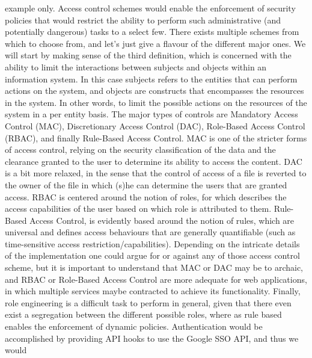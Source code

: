 \documentclass[11pt]{amsart}
\begin{document}
\begin{enumarate}
          example only. Access control schemes would enable the enforcement of security
          policies that would restrict the ability to perform such administrative (and
          potentially dangerous) tasks to a select few. There exists multiple schemes from
          which to choose from, and let's just give a flavour of the different major ones.
          We will start by making sense of the third definition, which is concerned with
          the ability to limit the interactions between subjects and objects within an
          information system. In this case subjects refers to the entities that can
          perform actions on the system, and objects are constructs that encompasses the
          resources in the system. In other words, to limit the possible actions on the
          resources of the system in a per entity basis. The major types of controls are
          Mandatory Access Control (MAC), Discretionary Access Control (DAC), Role-Based
          Access Control (RBAC), and finally Rule-Based Access Control. MAC is one of the
          stricter forms of access control, relying on the security classification of the
          data and the clearance granted to the user to determine its ability to access
          the content. DAC is a bit more relaxed, in the sense that the control of access
          of a file is reverted to the owner of the file in which (s)he can determine the
          users that are granted access. RBAC is centered around the notion of roles, for
          which describes the access capabilities of the user based on which role is
          attributed to them. Rule-Based Access Control, is evidently based around the
          notion of rules, which are universal and defines access behaviours that are
          generally quantifiable (such as time-sensitive access
          restriction/capabilities). Depending on the intricate details of the
          implementation one could argue for or against any of those access control
          scheme, but it is important to understand that MAC or DAC may be to archaic, and
          RBAC or Role-Based Access Control are more adequate for web applications, in
          which multiple services maybe contracted to achieve its functionality. Finally,
          role engineering is a difficult task to perform in general, given that there
          even exist a segregation between the different possible roles, where as rule
          based enables the enforcement of dynamic policies. Authentication would be
          accomplished by providing API hooks to use the Google SSO API, and thus we would

\end{enumarate}
\end{document}
